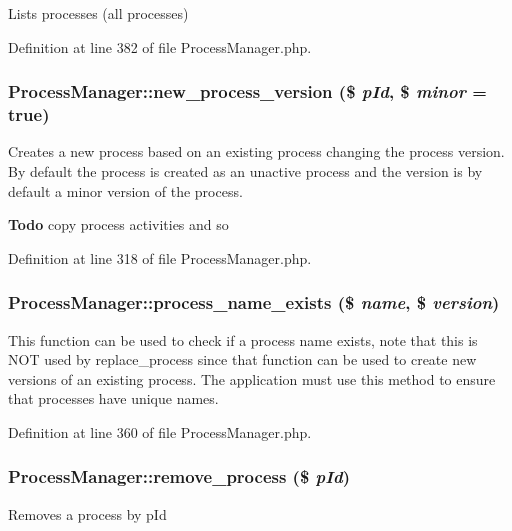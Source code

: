 Lists processes (all processes) 

Definition at line 382 of file Process\-Manager.php.
\subsubsection{\setlength{\rightskip}{0pt plus 5cm}Process\-Manager::new\_\-process\_\-version (\$ {\em p\-Id}, \$ {\em minor} = true)}\label{classProcessManager_a6}


Creates a new process based on an existing process changing the process version. By default the process is created as an unactive process and the version is by default a minor version of the process.

\begin{Desc}
\item[{\bf Todo}]copy process activities and so \end{Desc}


Definition at line 318 of file Process\-Manager.php.
\subsubsection{\setlength{\rightskip}{0pt plus 5cm}Process\-Manager::process\_\-name\_\-exists (\$ {\em name}, \$ {\em version})}\label{classProcessManager_a7}


This function can be used to check if a process name exists, note that this is NOT used by replace\_\-process since that function can be used to create new versions of an existing process. The application must use this method to ensure that processes have unique names. 

Definition at line 360 of file Process\-Manager.php.
\subsubsection{\setlength{\rightskip}{0pt plus 5cm}Process\-Manager::remove\_\-process (\$ {\em p\-Id})}\label{classProcessManager_a11}


Removes a process by p\-Id 

